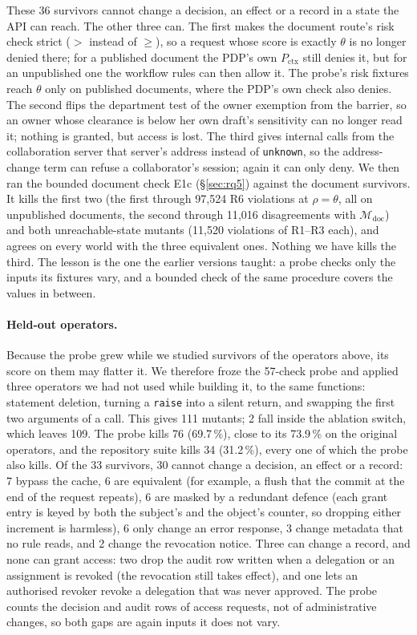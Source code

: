 \documentclass[sigconf,review,anonymous]{acmart}
\newcommand{\Px}{P_{\mathrm{ctx}}}
\begin{document}
These 36 survivors cannot change a decision, an effect or a record in a state the API can reach. The other three
can. The first makes the document route's risk check strict ($>$ instead of $\geq$), so a request whose score is
exactly $\theta$ is no longer denied there; for a published document the PDP's own $\Px$ still denies it, but for
an unpublished one the workflow rules can then allow it. The probe's risk fixtures reach $\theta$ only on published documents, where the PDP's own check also denies.
The second flips the department test of the owner exemption from the barrier, so an owner whose clearance is
below her own draft's sensitivity can no longer read it; nothing is granted, but access is lost. The third gives
internal calls from the collaboration server that server's address instead of \texttt{unknown}, so the
address-change term can refuse a collaborator's session; again it can only deny. We then ran the bounded
document check E1c (\S\ref{sec:rq5}) against the document survivors. It kills the first two (the first through
97{,}524 R6 violations at $\rho=\theta$, all on unpublished documents, the second through 11{,}016 disagreements
with $\mathcal{M}_{\mathrm{doc}}$) and both unreachable-state mutants (11{,}520 violations of R1--R3 each), and agrees on every world with the three equivalent ones.
Nothing we have kills the third. The lesson is the one the earlier versions taught: a probe checks only the
inputs its fixtures vary, and a bounded check of the same procedure covers the values in between.

\paragraph{Held-out operators.} Because the probe grew while we studied survivors of the operators above, its
score on them may flatter it. We therefore froze the 57-check probe and applied three operators we had not used
while building it, to the same functions: statement deletion, turning a \texttt{raise} into a silent return, and
swapping the first two arguments of a call. This gives 111 mutants; 2 fall inside the ablation switch, which
leaves 109. The probe kills 76 (69.7\,\%), close to its 73.9\,\% on the original operators, and the repository
suite kills 34 (31.2\,\%), every one of which the probe also kills. Of the 33 survivors, 30 cannot change a
decision, an effect or a record: 7 bypass the cache, 6 are equivalent (for example, a flush that the commit at
the end of the request repeats), 6 are masked by a redundant defence (each grant entry is keyed by both the
subject's and the object's counter, so dropping either increment is harmless), 6 only change an error response,
3 change metadata that no rule reads, and 2 change the revocation notice. Three can change a record, and none can
grant access: two drop the audit row written when a delegation or an assignment is revoked (the revocation still
takes effect), and one lets an authorised revoker revoke a delegation that was never approved. The probe counts
the decision and audit rows of access requests, not of administrative changes, so both gaps are again inputs it
does not vary.
\end{document}
